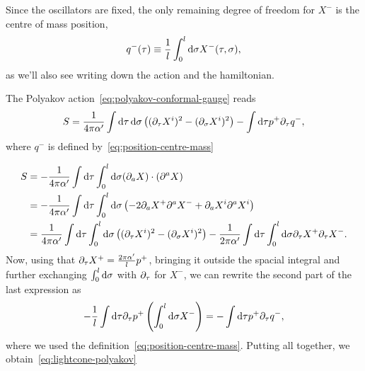 Since the oscillators are fixed, the only remaining degree of freedom for $X^-$ is the centre of mass position,
\begin{equation}\label{eq:position-centre-mass}
   q^-(\tau) \equiv \frac{1}{l} \int_0^l \mathop{}\!\mathrm{d} \sigma X^-(\tau, \sigma) ,
\end{equation}
as we'll also see writing down the action and the hamiltonian.

The Polyakov action~\eqref{eq:polyakov-conformal-gauge} reads
\begin{equation}\label{eq:lightcone-polyakov}
    S = \frac{1}{4\pi\alpha'} \int \mathop{}\!\mathrm{d} \tau \mathop{}\!\mathrm{d} \sigma \left( (\partial_\tau X^i)^2 - (\partial_\sigma X^i)^2 \right) - \int \mathop{}\!\mathrm{d} \tau p^+ \partial_\tau q^-,
\end{equation}
where $q^-$ is defined by~\eqref{eq:position-centre-mass}

\begin{mdframed}
\begin{innerproof}
    \begin{equation*}
    \begin{split}
        S &= -\frac{1}{4\pi\alpha'} \int \ud \tau \int_0^l \ud \sigma (\de_a X) \cdot (\de^a X) \\
        &= - \frac{1}{4\pi\alpha'} \int \ud \tau \int_0^l \ud \sigma \left( -2 \de_a X^+ \de^a X^- + \de_a X^i \de^a X^i \right) \\
        &= \frac{1}{4\pi\alpha'} \int \ud \tau \int_0^l \ud \sigma \left( (\de_\tau X^i)^2 - (\de_\sigma X^i)^2 \right) - \frac{1}{2\pi\alpha'} \int \ud \tau \int_0^l \ud \sigma \de_\tau X^+ \de_\tau X^- .
    \end{split}
    \end{equation*}
    Now, using that $\partial_\tau X^+ = \frac{2\pi\alpha'}{l} p^+$, bringing it outside the spacial integral and further exchanging $\int_0^l \mathop{}\!\mathrm{d} \sigma$ with $\partial_\tau$ for $X^-$, we can rewrite the second part of the last expression as
    \begin{equation*}
        -\frac{1}{l} \int \mathop{}\!\mathrm{d} \tau \partial_\tau p^+ \left( \int_0^l \mathop{}\!\mathrm{d} \sigma X^- \right) = - \int \mathop{}\!\mathrm{d} \tau p^+ \partial_\tau q^-,
    \end{equation*}
    where we used the definition~\eqref{eq:position-centre-mass}. Putting all together, we obtain~\eqref{eq:lightcone-polyakov}
\end{innerproof}
\end{mdframed}

